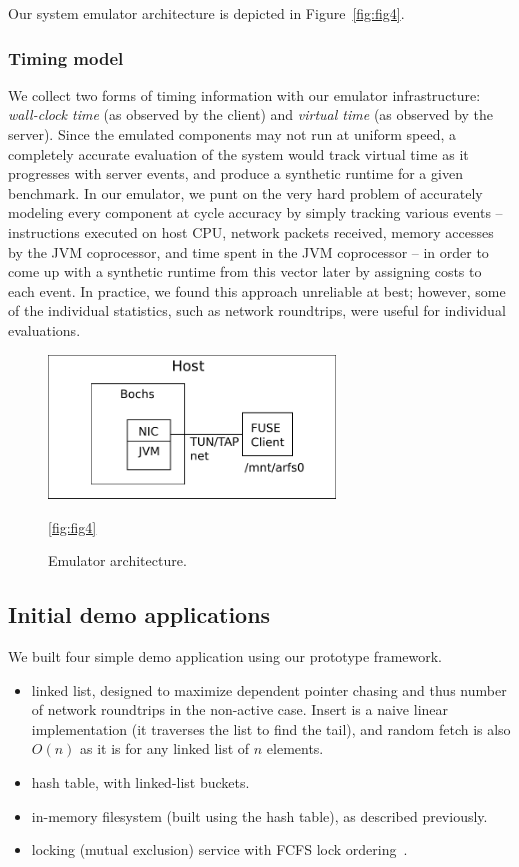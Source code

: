 \documentclass[10pt]{article}
\begin{document}
Our system emulator architecture is depicted in Figure~\ref{fig:fig4}.

\subsubsection{Timing model}

We collect two forms of timing information with our emulator
infrastructure: \emph{wall-clock time} (as observed by the client) and
\emph{virtual time} (as observed by the server). Since the emulated
components may not run at uniform speed, a completely accurate
evaluation of the system would track virtual time as it progresses
with server events, and produce a synthetic runtime for a given
benchmark. In our emulator, we punt on the very hard problem of
accurately modeling every component at cycle accuracy by simply
tracking various events -- instructions executed on host CPU, network
packets received, memory accesses by the JVM coprocessor, and time
spent in the JVM coprocessor -- in order to come up with a synthetic
runtime from this vector later by assigning costs to each event. In
practice, we found this approach unreliable at best; however, some of
the individual statistics, such as network roundtrips, were useful for
individual evaluations.

\begin{figure}
\centering
\includegraphics[width=3in]{fig/fig4.pdf}
\caption{Emulator architecture.}
\ref{fig:fig4}
\end{figure}
  
\subsection{Initial demo applications}

We built four simple demo application using our prototype framework. 

\begin{itemize}
\item linked list, designed to maximize dependent pointer chasing and
  thus number of network roundtrips in the non-active case. Insert is
  a naive linear implementation (it traverses the list to find the
  tail), and random fetch is also $O(n)$ as it is for any linked list
  of $n$ elements.
\item hash table, with linked-list buckets.
\item in-memory filesystem (built using the hash table), as described
  previously.
\item locking (mutual exclusion) service with FCFS lock ordering~\cite{nic-basedatomic}.  
\end{itemize}
\end{document}
